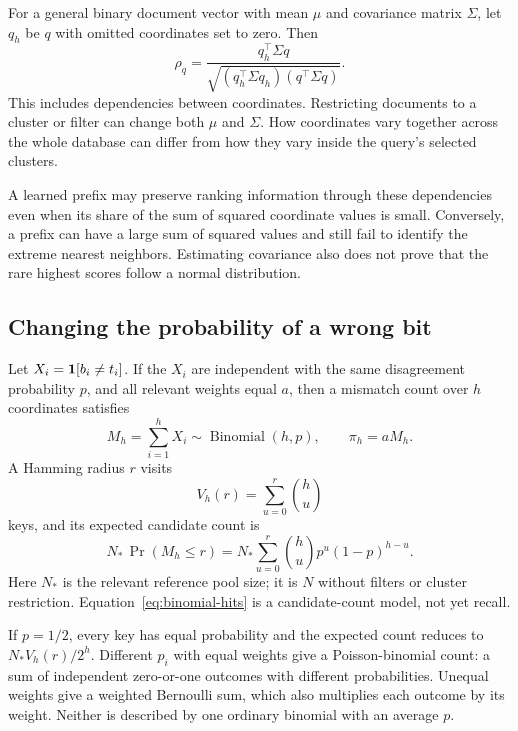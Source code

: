 For a general binary document vector with mean $\mu$ and covariance matrix $\Sigma$, let
$q_h$ be $q$ with omitted coordinates set to zero. Then
\begin{equation}
\rho_q=\frac{q_h^\top\Sigma q}
 {\sqrt{(q_h^\top\Sigma q_h)(q^\top\Sigma q)}}.
\label{eq:rho-covariance}
\end{equation}
This includes dependencies between coordinates. Restricting documents to a cluster or filter can
change both $\mu$ and $\Sigma$. How coordinates vary together across the whole database can differ from how they vary
inside the query's selected clusters.

A learned prefix may preserve ranking information through these dependencies even when its
share of the sum of squared coordinate values is small. Conversely, a prefix can have a large sum of squared values and
still fail to identify the extreme nearest neighbors. Estimating covariance also does not
prove that the rare highest scores follow a normal distribution.

\subsection{Changing the probability of a wrong bit}
Let $X_i=\mathbf 1[b_i\ne t_i]$. If the $X_i$ are independent with the same disagreement probability
$p$, and all relevant weights equal $a$, then a mismatch count over $h$ coordinates satisfies
\begin{equation}
M_h=\sum_{i=1}^{h}X_i\sim\operatorname{Binomial}(h,p),\qquad
\pi_h=aM_h.
\label{eq:binomial}
\end{equation}
A Hamming radius $r$ visits
\begin{equation}
V_h(r)=\sum_{u=0}^{r}\binom{h}{u}
\label{eq:hamming-volume}
\end{equation}
keys, and its expected candidate count is
\begin{equation}
N_*\,\Pr(M_h\leq r)
=N_*\sum_{u=0}^{r}\binom{h}{u}p^u(1-p)^{h-u}.
\label{eq:binomial-hits}
\end{equation}
Here $N_*$ is the relevant reference pool size; it is $N$ without filters or cluster restriction.
Equation~\eqref{eq:binomial-hits} is a candidate-count model, not yet recall.

If $p=1/2$, every key has equal probability and the expected count reduces to $N_*V_h(r)/2^h$.
Different $p_i$ with equal weights give a Poisson-binomial count: a sum of independent
zero-or-one outcomes with different probabilities. Unequal weights give a weighted Bernoulli sum,
which also multiplies each outcome by its weight. Neither is described by one ordinary binomial with an average $p$.

